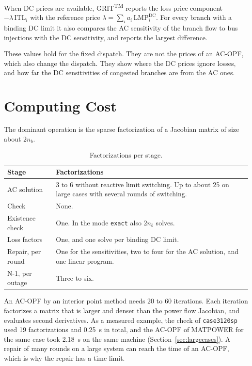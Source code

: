 \documentclass[a4paper,11pt]{article}
\newcommand{\TM}{\textsuperscript{TM}}
\newcommand{\GRIT}{GRIT\TM}
\begin{document}
When DC prices are available, \GRIT{} reports the loss price component $-\lambda\,\mathrm{ITL}_i$ with the reference price $\lambda=\sum_i a_i\,\mathrm{LMP}^{\mathrm{DC}}_i$. For every branch with a binding DC limit it also compares the AC sensitivity of the branch flow to bus injections with the DC sensitivity, and reports the largest difference.

\begin{warnbox}
These values hold for the fixed dispatch. They are not the prices of an AC-OPF, which also change the dispatch. They show where the DC prices ignore losses, and how far the DC sensitivities of congested branches are from the AC ones.
\end{warnbox}

\section{Computing Cost}\label{sec:cost}

The dominant operation is the sparse factorization of a Jacobian matrix of size about $2n_b$.

\begin{table}[H]\centering
\begin{tabular}{@{}lp{10.5cm}@{}}
\toprule
\textbf{Stage} & \textbf{Factorizations} \\
\midrule
AC solution & 3 to 6 without reactive limit switching. Up to about 25 on large cases with several rounds of switching. \\
Check & None. \\
Existence check & One. In the mode \texttt{exact} also $2n_b$ solves. \\
Loss factors & One, and one solve per binding DC limit. \\
Repair, per round & One for the sensitivities, two to four for the AC solution, and one linear program. \\
N-1, per outage & Three to six. \\
\bottomrule
\end{tabular}
\caption{Factorizations per stage.}
\end{table}

An AC-OPF by an interior point method needs 20 to 60 iterations. Each iteration factorizes a matrix that is larger and denser than the power flow Jacobian, and evaluates second derivatives. As a measured example, the check of \texttt{case3120sp} used 19 factorizations and 0.25~s in total, and the AC-OPF of MATPOWER for the same case took 2.18~s on the same machine (Section~\ref{sec:largecases}). A repair of many rounds on a large system can reach the time of an AC-OPF, which is why the repair has a time limit.
\end{document}
